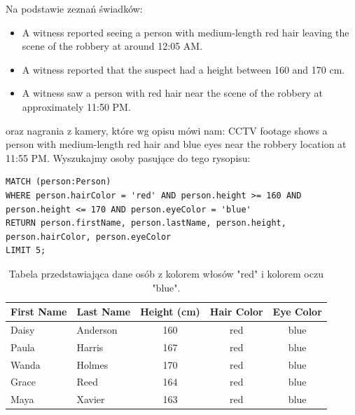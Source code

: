 \documentclass[a4paper,12pt]{article}
\begin{document}
\newpage
Na podstawie zeznań świadków:

\begin{itemize}
    \item A witness reported seeing a person with medium-length red hair leaving the scene of the robbery at around 12:05 AM.
    \item A witness reported that the suspect had a height between 160 and 170 cm.
    \item A witness saw a person with red hair near the scene of the robbery at approximately 11:50 PM.
\end{itemize}

oraz nagrania z kamery, które wg opisu mówi nam: CCTV footage shows a person with medium-length red hair and blue eyes near the robbery location at 11:55 PM.
\newline
\newline Wyszukajmy osoby pasujące do tego rysopisu:

\begin{center}
\begin{minipage}{0.8\linewidth}
\begin{lstlisting}[language=Cypher, basicstyle=\small, breaklines=true]
MATCH (person:Person)
WHERE person.hairColor = 'red' AND person.height >= 160 AND person.height <= 170 AND person.eyeColor = 'blue'
RETURN person.firstName, person.lastName, person.height, person.hairColor, person.eyeColor
LIMIT 5;
\end{lstlisting}
\end{minipage}
\end{center}

\begin{table}[h!]
\centering
\begin{tabular}{|l|l|c|c|c|}
\hline
\textbf{First Name} & \textbf{Last Name} & \textbf{Height (cm)} & \textbf{Hair Color} & \textbf{Eye Color} \\ \hline
Daisy               & Anderson           & 160                 & red                 & blue               \\ \hline
Paula               & Harris             & 167                 & red                 & blue               \\ \hline
Wanda               & Holmes             & 170                 & red                 & blue               \\ \hline
Grace               & Reed               & 164                 & red                 & blue               \\ \hline
Maya                & Xavier             & 163                 & red                 & blue               \\ \hline
\end{tabular}
\caption{Tabela przedstawiająca dane osób z kolorem włosów "red" i kolorem oczu "blue".}
\label{tab:person_data_with_eyes}
\end{table}
\end{document}
